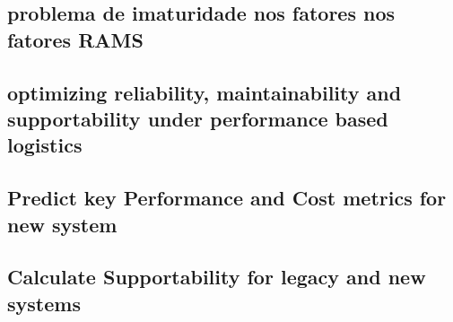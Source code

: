 \documentclass{article}
\begin{document}
\subsection{problema de imaturidade nos fatores nos fatores RAMS}

\subsection{optimizing reliability, maintainability and supportability under performance based logistics}

\subsection{Predict key Performance and Cost metrics for new system}

\subsection{Calculate Supportability for legacy and new systems}
\end{document}
